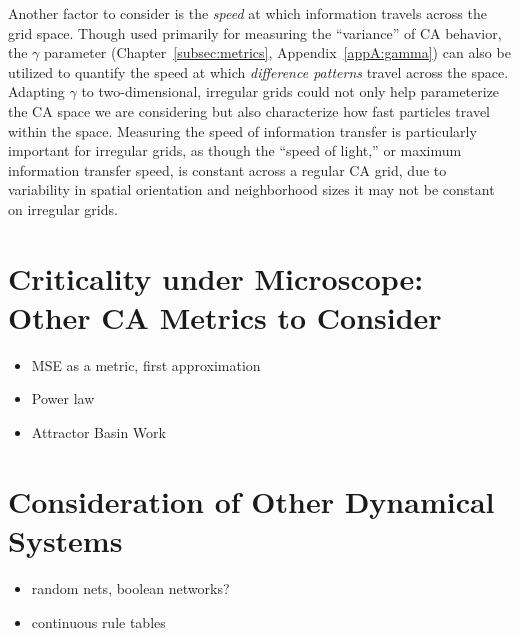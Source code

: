 \documentclass[a4paper,11pt,twoside]{report}
\begin{document}
Another factor to consider is the \textit{speed} at which information travels across the grid space. Though used primarily for measuring the ``variance'' of CA behavior, the $\gamma$ parameter (Chapter~\ref{subsec:metrics}, Appendix~\ref{appA:gamma}) can also be utilized to quantify the speed at which \textit{difference patterns} travel across the space. Adapting $\gamma$ to two-dimensional, irregular grids could not only help parameterize the CA space we are considering but also characterize how fast particles travel within the space. Measuring the speed of information transfer is particularly important for irregular grids, as though the ``speed of light,'' or maximum information transfer speed, is constant across a regular CA grid, due to variability in spatial orientation and neighborhood sizes it may not be constant on irregular grids.

\section{Criticality under Microscope: Other CA Metrics to Consider}



\begin{itemize}
\item MSE as a metric, first approximation
\item Power law
\item Attractor Basin Work
\end{itemize}

\section{Consideration of Other Dynamical Systems}
\begin{itemize}
\item random nets, boolean networks?
\item continuous rule tables
\end{itemize}
\end{document}
